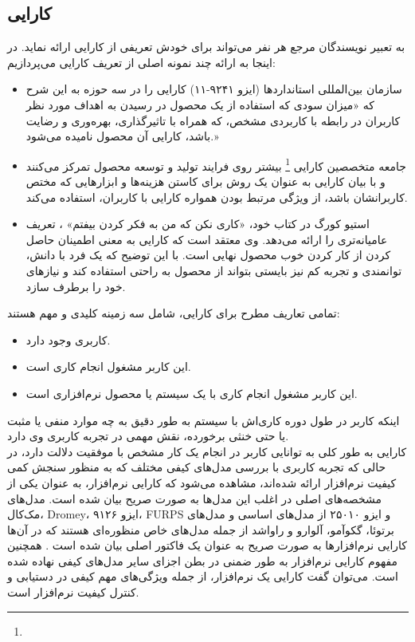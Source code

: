 \documentclass{report}
\theoremstyle{definition}
\begin{document}
\subsection{کارایی}
به تعبیر نویسندگان مرجع
\cite{measuring}
هر نفر می‌تواند برای خودش تعریفی از کارایی ارائه نماید. در اینجا به ارائه چند نمونه اصلی از تعریف کارایی می‌پردازیم:
\begin{itemize}
	\item
	سازمان بین‌المللی استانداردها (ایزو ۹۲۴۱-۱۱) کارایی را در سه حوزه به این شرح که «میزان سودی که استفاده از یک محصول در رسیدن به اهداف مورد نظر کاربران در رابطه با کاربردی مشخص، که همراه با تاثیرگذاری، بهره‌وری و رضایت باشد، کارایی آن محصول نامیده می‌شود.»
	\item 
	جامعه متخصصین کارایی
	\footnote{}
	بیشتر روی فرایند تولید و توسعه محصول تمرکز می‌کنند و با بیان کارایی به عنوان یک روش برای کاستن هزینه‌ها و ابزارهایی که مختص کاربرانشان باشد، از ویژگی مرتبط بودن همواره کارایی با کاربران، استفاده می‌کند.
	\item 
	استیو کورگ در کتاب خود، «کاری نکن که من به فکر کردن بیفتم»
	\cite{don't make me think}،
	تعریف عامیانه‌تری را ارائه می‌دهد. وی معتقد است که کارایی به معنی اطمینان حاصل کردن از کار کردن خوب محصول نهایی است. با این توضیح که یک فرد با دانش، توانمندی و تجربه کم نیز بایستی بتواند از محصول به راحتی استفاده کند و نیازهای خود را برطرف سازد.
\end{itemize}
تمامی تعاریف مطرح برای کارایی، شامل سه زمینه کلیدی و مهم هستند:
\begin{itemize}
	\item کاربری وجود دارد.
	\item این کاربر مشغول انجام کاری است.
	\item این کاربر مشغول انجام کاری با یک سیستم یا محصول نرم‌افزاری است.
\end{itemize}
اینکه کاربر در طول دوره کاری‌اش با سیستم به طور دقیق به چه موارد منفی یا مثبت یا حتی خنثی برخورده، نقش مهمی در تجربه کاربری وی دارد. \\
کارایی به طور کلی به توانایی کاربر در انجام یک کار مشخص با موفقیت دلالت دارد، در حالی که تجربه کاربری 
\cite{measuring}
با بررسی مدل‌های کیفی مختلف که به منظور سنجش کمی کیفیت نرم‌افزار ارائه شده‌اند، مشاهده می‌شود که کارایی نرم‌افزار، به عنوان یکی از مشخصه‌های اصلی در اغلب این مدل‌ها به صورت صریح  بیان شده است. مدل‌های مک‌کال، Dromey، ایزو ۹۱۲۶، FURPS و ایزو ۲۵۰۱۰ از مدل‌های اساسی و مدل‌های برتوئا، گکوآمو، آلوارو و راواشد از جمله مدل‌های خاص منظوره‌ای هستند که در آن‌ها کارایی نرم‌افزارها به صورت صریح به عنوان یک فاکتور اصلی بیان شده است 
\cite{pressman}.
همچنین مفهوم کارایی نرم‌افزار به طور ضمنی در بطن اجزای سایر مدل‌های کیفی نهاده شده است. می‌توان گفت کارایی یک نرم‌افزار، از جمله ویژگی‌های مهم کیفی در دستیابی و کنترل کیفیت نرم‌افزار است.
\end{document}
